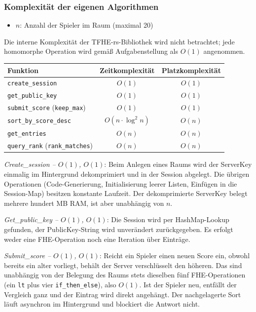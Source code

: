 \subsubsection{Komplexität der eigenen Algorithmen}

\begin{itemize}
    \item $n$: Anzahl der Spieler im Raum (maximal 20)
\end{itemize}

Die interne Komplexität der TFHE-rs-Bibliothek wird nicht betrachtet; jede homomorphe Operation wird gemäß Aufgabenstellung als $O(1)$ angenommen.

\begin{table}[H]
\centering
\begin{tabular}{||l|c|c||}
    \hline
    \textbf{Funktion} & \textbf{Zeitkomplexität} & \textbf{Platzkomplexität} \\
    \hline\hline
    \texttt{create\_session} & $O(1)$ & $O(1)$ \\
    \hline
    \texttt{get\_public\_key} & $O(1)$ & $O(1)$ \\
    \hline
    \texttt{submit\_score} (\texttt{keep\_max}) & $O(1)$ & $O(1)$ \\
    \hline
    \texttt{sort\_by\_score\_desc} & $O(n \cdot \log^2 n)$ & $O(n)$ \\
    \hline
    \texttt{get\_entries} & $O(n)$ & $O(n)$ \\
    \hline
    \texttt{query\_rank} (\texttt{rank\_matches}) & $O(n)$ & $O(n)$ \\
    \hline
\end{tabular}
\end{table}

\textit{Create\_session -- $O(1)$, $O(1)$}: Beim Anlegen eines Raums wird der ServerKey einmalig im Hintergrund dekomprimiert und in der Session abgelegt. Die übrigen Operationen (Code-Generierung, Initialisierung leerer Listen, Einfügen in die Session-Map) besitzen konstante Laufzeit. Der dekomprimierte ServerKey belegt mehrere hundert MB RAM, ist aber unabhängig von $n$.

\textit{Get\_public\_key -- $O(1)$, $O(1)$}: Die Session wird per HashMap-Lookup gefunden, der PublicKey-String wird unverändert zurückgegeben. Es erfolgt weder eine FHE-Operation noch eine Iteration über Einträge.

\textit{Submit\_score -- $O(1)$, $O(1)$}: Reicht ein Spieler einen neuen Score ein, obwohl bereits ein alter vorliegt, behält der Server verschlüsselt den höheren. Das sind unabhängig von der Belegung des Raums stets dieselben fünf FHE-Operationen (ein \texttt{lt} plus vier \texttt{if\_then\_else}), also $O(1)$. Ist der Spieler neu, entfällt der Vergleich ganz und der Eintrag wird direkt angehängt. Der nachgelagerte Sort läuft asynchron im Hintergrund und blockiert die Antwort nicht.

